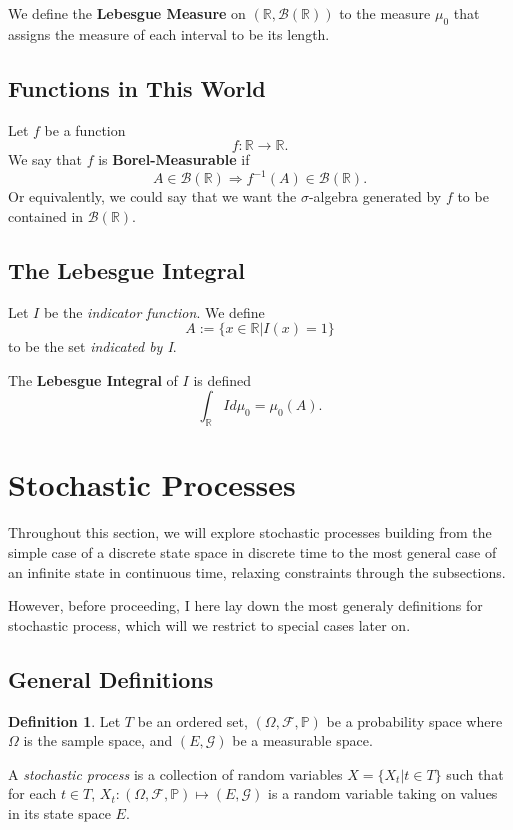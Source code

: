 \documentclass[a4paper,12pt]{article}
\theoremstyle{plain}
\theoremstyle{definition}
\newtheorem{defn}[thm]{Definition}
\theoremstyle{remark}
\begin{document}
We define the \textbf{Lebesgue Measure} on $(\mathbb{R}, \mathcal{B}(\mathbb{R}))$ to the measure $\mu_0$ that assigns the measure of
each interval to be its length.

\subsection{Functions in This World}

Let $f$ be a function
\[ f: \mathbb{R} \rightarrow \mathbb{R}. \]
We say that $f$ is \textbf{Borel-Measurable} if
\[ A \in \mathcal{B}(\mathbb{R}) \Rightarrow f^{-1}(A) \in \mathcal{B}(\mathbb{R}). \]
Or equivalently, we could say that we want the $\sigma$-algebra generated by $f$ to be contained in $\mathcal{B}(\mathbb{R})$.

\subsection{The Lebesgue Integral}

Let $I$ be the \emph{indicator function}.  We define
\[ A := \{ x \in \mathbb{R}| I(x) =1 \} \]
to be the set \emph{indicated by I}.

The \textbf{Lebesgue Integral} of $I$ is defined
\[ \int_{\mathbb{R}} I d\mu_0 = \mu_0(A). \]


\section{Stochastic Processes}

Throughout this section, we will explore stochastic processes building
from the simple case of a discrete state space in discrete time to the
most general case of an infinite state in continuous time, relaxing constraints through the subsections.

However, before proceeding, I here lay down the most generaly
definitions for stochastic process, which will we restrict to special
cases later on.

\subsection{General Definitions}

\begin{defn}{\citep{pavliotis}}
Let $T$ be an ordered set, $(\Omega,\mathscr{F},\mathbb{P})$ be a
probability space where $\Omega$ is the sample space, and
$(E,\mathscr{G})$ be a measurable space.

A \emph{stochastic process} is a collection of random variables $X =
\{X_t | t\in T\}$ such that for each $t\in T$, $X_t:
(\Omega,\mathscr{F},\mathbb{P})\mapsto (E,\mathscr{G})$ is a random
variable taking on values in its state space $E$.
\end{defn}
\end{document}
